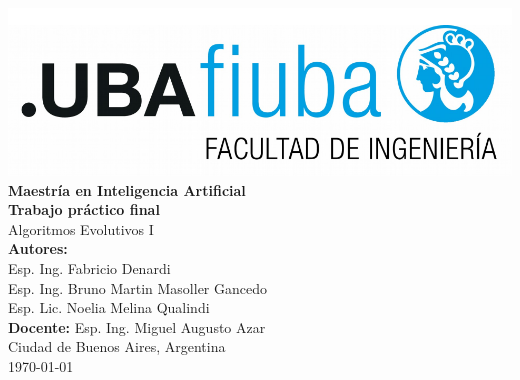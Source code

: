 \begin{titlepage}
    \centering
    \includegraphics[width=1\textwidth]{Figures/logoFIUBA.pdf}\\[2cm]

    {\Large \textbf{Maestría en Inteligencia Artificial}}\\[1cm]

    {\Huge \textbf{Trabajo práctico final}}\\[0.5cm]
    {\Large Algoritmos Evolutivos I}\\[2cm]

    \textbf{Autores:}\\[0.3cm]
    Esp. Ing. Fabricio Denardi \\ 
    Esp. Ing. Bruno Martin	Masoller Gancedo \\
    Esp. Lic. Noelia Melina	Qualindi \\[1cm]
    
    \textbf{Docente:} Esp. Ing. Miguel Augusto	Azar \\[2cm]

    \vfill
    {\large Ciudad de Buenos Aires, Argentina \\[0.3cm]
    \today}
\end{titlepage}
